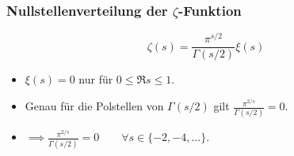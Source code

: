 \begin{frame}
    \frametitle{Nullstellenverteilung der $\zeta$-Funktion}
    \[
        \zeta(s) = \frac{\pi^{s/2}}{\Gamma(s/2)}\xi(s)  
    \]
    \begin{itemize}
        \item<2-> $\xi(s) = 0$ nur für $0 \leq \Re s \leq 1$.
        \item<3-> Genau für die Polstellen von $\Gamma(s/2)$ gilt $\frac{\pi^{2/s}}{\Gamma(s/2)} = 0$.
        \item<4-> $\implies \frac{\pi^{2/s}}{\Gamma(s/2)} = 0\qquad \forall s \in \{-2, -4, \dots\}$.
    \end{itemize}
\end{frame}